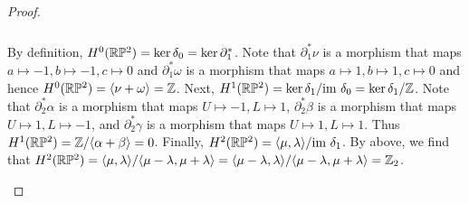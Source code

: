 \documentclass{../../mathnotes}
\begin{document}
\begin{proof}
\begin{enumerate}[(a)]
\begin{equation*}
\begin{tikzcd}
                \end{tikzcd}
            \end{equation*}
            By definition, $H^0(\mathbb{R}\mathbb{P}^2)=\ker\delta_0=\ker\partial_1^*$. Note that $\partial_1^*\nu$ is a morphism that maps
            $a\mapsto -1,b\mapsto -1,c\mapsto 0$ and $\partial_1^*\omega$ is a morphism that maps $a\mapsto1,b\mapsto1,c\mapsto0$
            and hence $H^0(\mathbb{R}\mathbb{P}^2)=\langle \nu+\omega\rangle=\mathbb{Z}$. Next, $H^1(\mathbb{R}\mathbb{P}^2)=\ker\delta_1/\text{im }\delta_0=\ker\delta_1/\mathbb{Z}$.
            Note that $\partial_2^*\alpha$ is a morphism that maps $U\mapsto -1,L\mapsto 1$, $\partial_2^*\beta$ is a morphism
            that maps $U\mapsto 1,L\mapsto -1$, and $\partial_2^*\gamma$ is a morphism that maps $U\mapsto 1,L\mapsto 1$. Thus
            $H^1(\mathbb{R}\mathbb{P}^2)=\mathbb{Z}/\langle\alpha+\beta\rangle=0$. Finally, $H^2(\mathbb{R}\mathbb{P}^2)=\langle\mu,\lambda\rangle/\text{im }\delta_1$.
            By above, we find that $H^2(\mathbb{R}\mathbb{P}^2)=\langle\mu,\lambda\rangle/\langle\mu-\lambda,\mu+\lambda\rangle=
            \langle \mu-\lambda,\lambda\rangle/\langle\mu-\lambda,\mu+\lambda\rangle=\mathbb{Z}_2$.


\end{enumerate}
\end{proof}
\end{document}
